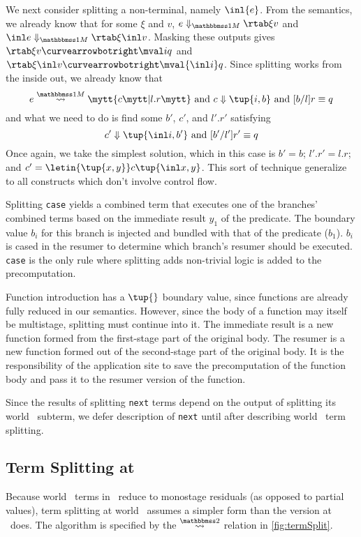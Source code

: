 \begin{abstrsyn}
We next consider splitting a non-terminal, namely $\inl {e}$.
From the semantics, we already know that 
for some $\xi$ and $v$, $\diaone {e} \xi v$ and $\diaone {\inl e} \xi {\inl v}$.
Masking these outputs gives $\rtab \xi v \vsplito \mval i q$ 
and $\rtab \xi {\inl v} \vsplito \mval {\inl i} q$.
Since splitting works from the inside out, we already know that
\[
	\splitone e A c {l.r} \text{ and } \reduce c {\tup{i,b}} \text{ and } [b/l]r \equiv q
\]
and what we need to do is find some $b'$, $c'$, and $l'.r'$ satisfying
\[
	\reduce {c'} {\tup{\inl i,b'}} \text{ and } [b'/l']r' \equiv q
\]
Once again, we take the simplest solution, which in this case is $b' = b$; $l'.r' = l.r$;
and $c' = \letin {\tup {x,y}} c {\tup{\inl x, y}}$.  
This sort of technique generalize to all constructs which don't involve control flow.


Splitting {\tt case} yields a combined term that executes one of the branches' combined terms based on the immediate result $y_1$ of the predicate.
The boundary value $b_i$ for this branch is injected and bundled with that of the predicate ($b_1$).   
$b_i$ is cased in the resumer to determine which branch's resumer should be executed.
{\tt case} is the only rule where splitting adds non-trivial logic is added to the precomputation.

Function introduction has a $\tup{}$ boundary value,
since functions are already fully reduced in our semantics.
However, since the body of a function may itself be multistage, splitting must continue into it.
The immediate result is a new function formed from the first-stage part of the original body.
The resumer is a new function formed out of the second-stage part of the original body.
It is the responsibility of the application site to save the precomputation of the function body
and pass it to the resumer version of the function.

Since the results of splitting \texttt{next} terms depend on the output of
splitting its world \bbtwo\ subterm,
we defer description of \texttt{next} until after describing world \bbtwo\ term splitting.

\subsection{Term Splitting at \bbtwo}

Because world \bbtwo\ terms in \lang\ reduce to monostage residuals (as opposed to partial values),
term splitting at world \bbtwo\ assumes a simpler form than the version at \bbonem\ does. 
The algorithm is specified by the $\splittwosym$ relation in \cref{fig:termSplit}.


\end{abstrsyn}

